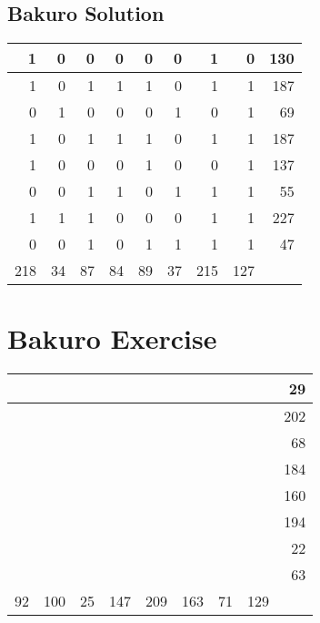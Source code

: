 \documentclass[]{article}
\begin{document}
 \subsection{Bakuro Solution} 
\begin{tabular}{rrrrrrrrr}
\hline
   1 &  0 &  0 &  0 &  0 &  0 &   1 &   0 & 130 \\ \hline
   1 &  0 &  1 &  1 &  1 &  0 &   1 &   1 & 187 \\ \hline
   0 &  1 &  0 &  0 &  0 &  1 &   0 &   1 &  69 \\ \hline
   1 &  0 &  1 &  1 &  1 &  0 &   1 &   1 & 187 \\ \hline
   1 &  0 &  0 &  0 &  1 &  0 &   0 &   1 & 137 \\ \hline
   0 &  0 &  1 &  1 &  0 &  1 &   1 &   1 &  55 \\ \hline
   1 &  1 &  1 &  0 &  0 &  0 &   1 &   1 & 227 \\ \hline
   0 &  0 &  1 &  0 &  1 &  1 &   1 &   1 &  47 \\ \hline
 218 & 34 & 87 & 84 & 89 & 37 & 215 & 127 &     \\ \hline
\hline
\end{tabular}\newpage\section{Bakuro Exercise}\begin{tabular}{rrrrrrrrr}
\hline
    &     &    &     &     &     &    &     &  29 \\ \hline
    &     &    &     &     &     &    &     & 202 \\ \hline
    &     &    &     &     &     &    &     &  68 \\ \hline
    &     &    &     &     &     &    &     & 184 \\ \hline
    &     &    &     &     &     &    &     & 160 \\ \hline
    &     &    &     &     &     &    &     & 194 \\ \hline
    &     &    &     &     &     &    &     &  22 \\ \hline
    &     &    &     &     &     &    &     &  63 \\ \hline
 92 & 100 & 25 & 147 & 209 & 163 & 71 & 129 &     \\ \hline
\hline
\end{tabular}\newpage 
\end{document}
